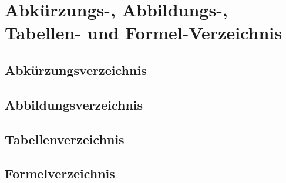 \section{Abkürzungs-, Abbildungs-, Tabellen- und Formel-Verzeichnis}

\subsection{Abkürzungsverzeichnis}

\subsection{Abbildungsverzeichnis}

\subsection{Tabellenverzeichnis}

\subsection{Formelverzeichnis}



\newpage